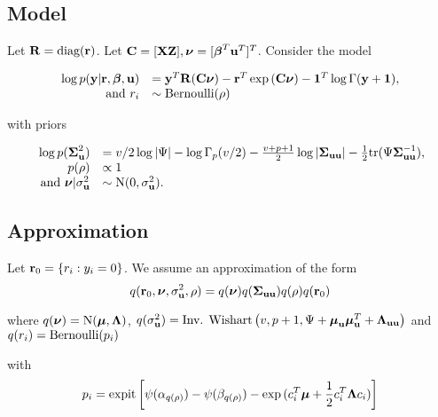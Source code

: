 \documentclass{article}[12pt]
\begin{document}


\subsection{Model}
Let ${\bf R} = \text{diag}{({\bf r})}$. Let ${\bf C} = [{\bf X} {\bf Z}], {\boldsymbol \nu} = [{\boldsymbol \beta}^T {\bf u}^T]^T$. Consider the
model

$$
\begin{array}{rl}
\log{p({\bf y}|{\bf r}, {\boldsymbol\beta}, {\bf u})} &= {\bf y}^T {\bf R} ({\bf C}{\boldsymbol \nu}) - {\bf r}^T \exp{({\bf C}{\boldsymbol\nu})} - {\bf 1}^T \log{\Gamma{({\bf y}+ {\bf1})}}, \\
\mbox{ and }
r_i &\sim \text{Bernoulli}(\rho) \\
\end{array}
$$

\noindent with priors

$$ 
\begin{array}{rl}
\log{p({\boldsymbol\Sigma}_{\bf u}^2)} &= v/2 \log |\Psi| - \log \Gamma_p (v/2) - \frac{v+p+1}{2} \log | {\boldsymbol \Sigma}_{{\bf u} {\bf u}}| - {\frac{1}{2}} \text{tr} (\Psi {\boldsymbol\Sigma}^{-1}_{{\bf u} {\bf u}}),\\
p(\rho) &\propto 1 \\
\mbox{ and } {\boldsymbol\nu}|\sigma_{\bf u}^2 &\sim \mbox{N}(0, \sigma_{\bf u}^2). \\
\end{array}
$$

\subsection{Approximation}
Let ${\bf r}_0 = \{ r_i : y_i = 0 \}$.
We assume an approximation of the form
$$
q({\bf r}_0, {\boldsymbol \nu}, \sigma_{{\bf u}}^2, \rho) = q({\boldsymbol \nu}) q({\boldsymbol \Sigma}_{{\bf u} {\bf u}}) q(\rho) q({\bf r}_0) \\
$$

\noindent where $q({\boldsymbol \nu}) = \mbox{N}({\boldsymbol \mu}, {\boldsymbol \Lambda})$, $q(\sigma_{{\bf u}}^2) = \mbox{Inv. Wishart}\left(v, p+1, \Psi + {\boldsymbol \mu}_{\bf u} {\boldsymbol \mu}_{\bf u}^T + {\boldsymbol \Lambda}_{{\bf u} {\bf u}}\right)$ \mbox{and } $q(r_i) = \text{Bernoulli} (p_i)$

\noindent with
$$
p_i = \text{expit} \left[ \psi{(\alpha_{q(\rho)})} - \psi{(\beta_{q(\rho)})} - \exp{(c_i^T{\boldsymbol\mu}+ {\frac{1}{2}}c_i^T {\boldsymbol\Lambda}c_i)} \right]
$$
\end{document}
